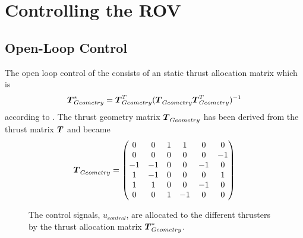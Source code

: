 \chapter{Controlling the ROV} \label{cha:controller}

\section{Open-Loop Control}
The open loop control of the \abbrROV consists of an static thrust allocation matrix which is
\begin{equation}
    \thrusterGeometryOnes[*] = \thrusterGeometryOnes[T](\thrusterGeometryOnes \thrusterGeometryOnes[T])^{-1}
\end{equation}
according to \citet{thrustallocation}. The thrust geometry matrix $\thrusterGeometryOnes$ has been derived from the thrust matrix $\thrusterGeometry$ and became 
\begin{equation*}
    \thrusterGeometryOnes = 
    \begin{pmatrix}
    0  & 0  & 1 & 1  &  0 &  0 \\
    0  & 0  & 0 & 0  &  0 & -1 \\
    -1 & -1 & 0 & 0  & -1 &  0 \\
    1  & -1 & 0 & 0  &  0 &  1 \\
    1  & 1  & 0 & 0  & -1 &  0 \\
    0  & 0  & 1 & -1 &  0 &  0 \\
    \end{pmatrix}
\end{equation*}


\begin{figure}
    \centering

    \caption{The control signals, $u_{control}$, are allocated to the different thrusters by the thrust allocation matrix $\thrusterGeometryOnes[*]$.} 
    \label{fig:open_control}
\end{figure}

